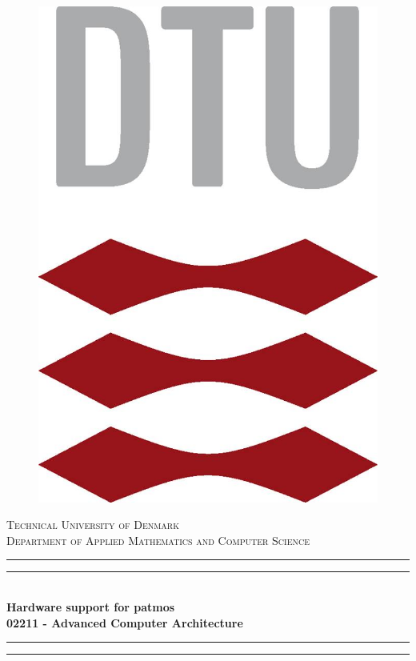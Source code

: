 \documentclass{article}
\begin{document}
\begin{titlepage}

\begin{figure}[ht]
\centering
\includegraphics[scale=0.15]{DTUlogo.png}
\end{figure}

\vspace*{\baselineskip}
\centering
\textsc{\LARGE Technical University of Denmark}\\[0.5cm]
\centering
\textsc{\large  Department of Applied Mathematics and Computer Science}\\[0.5cm]

\rule{\textwidth}{1.6pt}\vspace*{-\baselineskip}\vspace*{2pt} %
\rule{\textwidth}{0.4pt}\\[\baselineskip] %
{ \huge \bfseries Hardware support for patmos}\\[0.4cm] %
\vspace{0.5cm}
{ \Large \bfseries 02211 - Advanced Computer Architecture }\\[0.5cm]
\rule{\textwidth}{0.4pt}\vspace*{-\baselineskip}\vspace{3.2pt} %
\rule{\textwidth}{1.6pt}\\[2\baselineskip] %


\end{titlepage}
\end{document}

